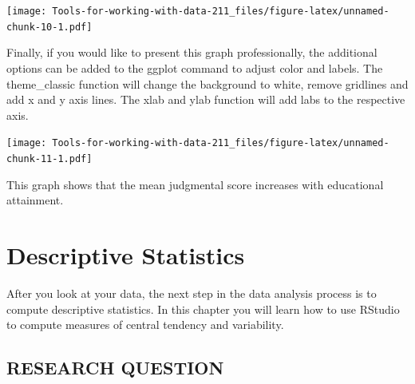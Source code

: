 \documentclass[
]{book}
\newenvironment{Shaded}{\begin{snugshade}}{\end{snugshade}}
\newcommand{\DataTypeTok}[1]{\textcolor[rgb]{0.13,0.29,0.53}{#1}}
\newcommand{\FloatTok}[1]{\textcolor[rgb]{0.00,0.00,0.81}{#1}}
\newcommand{\KeywordTok}[1]{\textcolor[rgb]{0.13,0.29,0.53}{\textbf{#1}}}
\newcommand{\NormalTok}[1]{#1}
\newcommand{\OperatorTok}[1]{\textcolor[rgb]{0.81,0.36,0.00}{\textbf{#1}}}
\newcommand{\StringTok}[1]{\textcolor[rgb]{0.31,0.60,0.02}{#1}}
\begin{document}
\texttt{[image: Tools-for-working-with-data-211\_files/figure-latex/unnamed-chunk-10-1.pdf]}

Finally, if you would like to present this graph professionally, the additional options can be added to the ggplot command to adjust color and labels. The theme\_classic function will change the background to white, remove gridlines and add x and y axis lines. The xlab and ylab function will add labs to the respective axis.

\begin{Shaded}
\end{Shaded}

\texttt{[image: Tools-for-working-with-data-211\_files/figure-latex/unnamed-chunk-11-1.pdf]}

This graph shows that the mean judgmental score increases with educational attainment.

\hypertarget{descriptive-statistics}{%
\chapter{Descriptive Statistics}\label{descriptive-statistics}}

After you look at your data, the next step in the data analysis process is to compute descriptive statistics. In this chapter you will learn how to use RStudio to compute measures of central tendency and variability.

\hypertarget{research-question-1}{%
\section{RESEARCH QUESTION}\label{research-question-1}}
\end{document}
